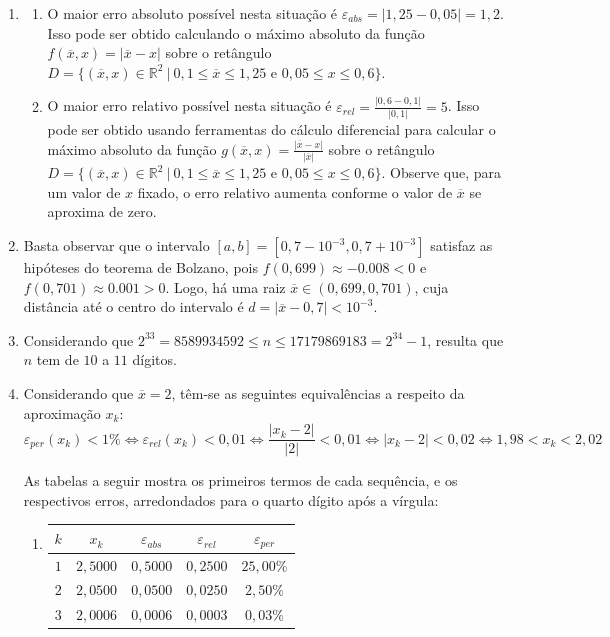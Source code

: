 \documentclass[12pt,a4paper]{article}
\newcommand*\R{\mathbb{R}}
\begin{document}
\begin{enumerate}
\item
\begin{enumerate}
\item O maior erro absoluto possível nesta situação é $\varepsilon_{abs} = |1,25 - 0,05| = 1,2$. Isso pode ser obtido calculando o máximo absoluto da função $f(\overline{x}, x) = |\overline{x} - x|$ sobre o retângulo $D = \{ (\overline{x}, x) \in \R^2 \ |\ 0,1 \leq \overline{x} \leq 1,25 \text{ e } 0,05 \leq x \leq 0,6 \}$.

\item O maior erro relativo possível nesta situação é $\varepsilon_{rel} = \frac{|0,6 - 0,1| }{ |0,1|} = 5$. Isso pode ser obtido usando ferramentas do cálculo diferencial para calcular o máximo absoluto da função $g(\overline{x}, x) = \frac{|\overline{x}-x| }{ |\overline{x}|}$ sobre o retângulo $D = \{ (\overline{x}, x) \in \R^2 \ |\ 0,1 \leq \overline{x} \leq 1,25 \text{ e } 0,05 \leq x \leq 0,6 \}$. Observe que, para um valor de $x$ fixado, o erro relativo aumenta conforme o valor de $\overline{x}$ se aproxima de zero.
\end{enumerate}

\item Basta observar que o intervalo $[a,b] = [0,7-10^{-3}, 0,7+10^{-3}]$ satisfaz as hipóteses do teorema de Bolzano, pois $f(0,699) \approx -0.008 < 0$ e $f(0,701) \approx 0.001 > 0$. Logo, há uma raiz $\overline{x} \in (0,699, 0,701)$, cuja distância até o centro do intervalo é $d = |\overline{x} - 0,7| < 10^{-3}$.
\item Considerando que $2^{33} = 8589934592 \leq n \leq 17179869183 = 2^{34}-1$, resulta que $n$ tem de $10$ a $11$ dígitos.
\item Considerando que $\overline{x} = 2$, têm-se as seguintes equivalências a respeito da aproximação $x_k$:
\[
\varepsilon_{per}(x_k) < 1\%
\Leftrightarrow
\varepsilon_{rel}(x_k) < 0,01
\Leftrightarrow
\frac{|x_k - 2|}{|2|} < 0,01
\Leftrightarrow
|x_k - 2| < 0,02
\Leftrightarrow
1,98 < x_k < 2,02
\]

As tabelas a seguir mostra os primeiros termos de cada sequência, e os respectivos erros, arredondados para o quarto dígito após a vírgula:
\begin{enumerate}
\item
\begin{tabular}{|c|c|c|c|c|}
\hline
$k$ & $x_k$ & $\varepsilon_{abs}$ & $\varepsilon_{rel}$ & $\varepsilon_{per}$ \\
\hline
$1$ & $2,5000$ & $0,5000$ & $0,2500$ & $25,00\%$ \\
\hline
$2$ & $2,0500$ & $0,0500$ & $0,0250$ & $2,50\%$ \\
\hline
$3$ & $2,0006$ & $0,0006$ & $0,0003$ & $0,03\%$ \\
\hline
\end{tabular}


\end{enumerate}
\end{enumerate}
\end{document}
